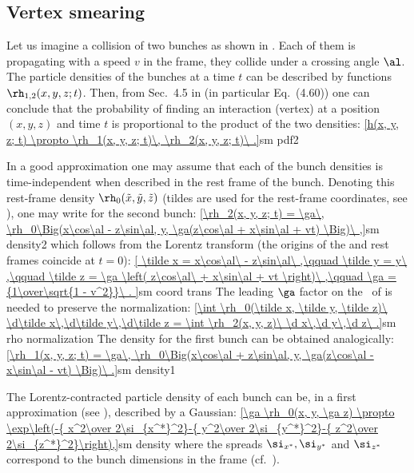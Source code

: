 \subsection{Vertex smearing}


Let us imagine a collision of two bunches as shown in . Each of them is propagating with a speed $v$ in the  frame, they collide under a crossing angle $\al$. The particle densities of the bunches at a time $t$ can be described by functions $\rh_{1, 2}(x, y, z; t)$. Then, from Sec.~4.5 in  (in particular Eq.~(4.60)) one can conclude that the probability of finding an interaction (vertex) at a position $(x, y, z)$ and time $t$ is proportional to the product of the two densities:
\eqref{h(x, y, z; t) \propto \rh_1(x, y, z; t)\, \rh_2(x, y, z; t)\ .}{sm pdf2}

In a good approximation one may assume that each of the bunch densities is time-independent when described in the rest frame of the bunch. Denoting this rest-frame density $\rh_0(\tilde x, \tilde y, \tilde z)$ (tildes are used for the rest-frame coordinates, see ), one may write for the second bunch:
\eqref{\rh_2(x, y, z; t) = \ga\, \rh_0\Big(x\cos\al - z\sin\al, y, \ga(z\cos\al + x\sin\al + vt) \Big)\ ,}{sm density2}
which follows from the Lorentz transform (the origins of the  and rest frames coincide at $t=0$):
\eqref{
	\tilde x = x\cos\al\ - z\sin\al\ ,\qquad
	\tilde y = y\ ,\qquad
	\tilde z = \ga \left( z\cos\al\ + x\sin\al + vt \right)\ ,\qquad
	\ga = {1\over\sqrt{1 - v^2}}\ .
}{sm coord trans}
The leading $\ga$ factor on the \rhs~of  is needed to preserve the normalization:
\eqref{\int \rh_0(\tilde x, \tilde y, \tilde z)\ \d\tilde x\,\d\tilde y\,\d\tilde z = \int \rh_2(x, y, z)\ \d x\,\d y\,\d z\ .}{sm rho normalization}
The density for the first bunch can be obtained analogically:
\eqref{\rh_1(x, y, z; t) = \ga\, \rh_0\Big(x\cos\al + z\sin\al, y, \ga(z\cos\al - x\sin\al - vt) \Big)\ .}{sm density1}

The Lorentz-contracted particle density of each bunch can be, in a first approximation (see ), described by a Gaussian:
\eqref{\ga \rh_0(x, y, \ga z) \propto \exp\left(-{ x^2\over 2\si_{x^*}^2}-{ y^2\over 2\si_{y^*}^2}-{ z^2\over 2\si_{z^*}^2}\right),}{sm density}
where the spreads $\si_{x^*}, \si_{y^*}$ and $\si_{z^*}$ correspond to the bunch dimensions in the  frame (cf.~).

